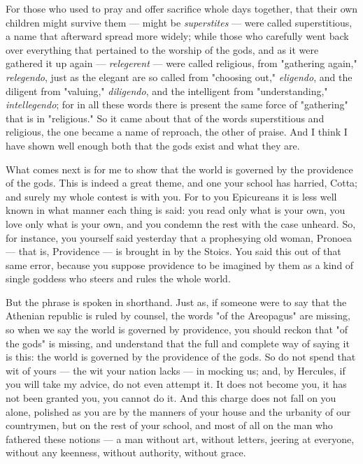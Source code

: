  For those who used to pray and offer sacrifice whole days together, that their own children might survive them --- might be \textit{superstites} --- were called superstitious, a name that afterward spread more widely; while those who carefully went back over everything that pertained to the worship of the gods, and as it were gathered it up again --- \textit{relegerent} --- were called religious, from "gathering again," \textit{relegendo}, just as the elegant are so called from "choosing out," \textit{eligendo}, and the diligent from "valuing," \textit{diligendo}, and the intelligent from "understanding," \textit{intellegendo}; for in all these words there is present the same force of "gathering" that is in "religious." So it came about that of the words superstitious and religious, the one became a name of reproach, the other of praise. And I think I have shown well enough both that the gods exist and what they are.

 What comes next is for me to show that the world is governed by the providence of the gods. This is indeed a great theme, and one your school has harried, Cotta; and surely my whole contest is with you. For to you Epicureans it is less well known in what manner each thing is said: you read only what is your own, you love only what is your own, and you condemn the rest with the case unheard. So, for instance, you yourself said yesterday that a prophesying old woman, Pronoea --- that is, Providence --- is brought in by the Stoics. You said this out of that same error, because you suppose providence to be imagined by them as a kind of single goddess who steers and rules the whole world.

 But the phrase is spoken in shorthand. Just as, if someone were to say that the Athenian republic is ruled by counsel, the words "of the Areopagus" are missing, so when we say the world is governed by providence, you should reckon that "of the gods" is missing, and understand that the full and complete way of saying it is this: the world is governed by the providence of the gods. So do not spend that wit of yours --- the wit your nation lacks --- in mocking us; and, by Hercules, if you will take my advice, do not even attempt it. It does not become you, it has not been granted you, you cannot do it. And this charge does not fall on you alone, polished as you are by the manners of your house and the urbanity of our countrymen, but on the rest of your school, and most of all on the man who fathered these notions --- a man without art, without letters, jeering at everyone, without any keenness, without authority, without grace.

